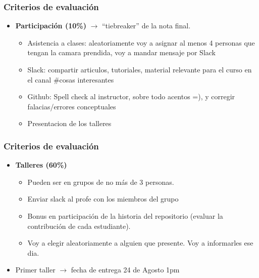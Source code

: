 \documentclass[
  shownotes,
  xcolor={svgnames},
  hyperref={colorlinks,citecolor=DarkBlue,linkcolor=DarkRed,urlcolor=DarkBlue}
  , aspectratio=169]{beamer}
\begin{document}
\begin{frame}
\frametitle{Criterios de evaluación}

\begin{itemize}
\item {\bf Participación (10\%)} $\rightarrow$ ``tiebreaker'' de la nota final. 
\medskip
  \begin{itemize}
    \item Asistencia a clases: aleatoriamente voy a asignar al menos 4 personas que tengan la camara prendida, voy a mandar mensaje por Slack
    \medskip
    \item Slack: compartir articulos, tutoriales, material relevante para el curso en el canal \#cosas interesantes
    \medskip
    \item Github: Spell check al instructor, sobre todo acentos =), y corregir falacias/errores conceptuales
    \medskip
    \item Presentacion de los talleres

  \end{itemize}
\end{itemize}

\end{frame}
\begin{frame}
\frametitle{Criterios de evaluación}
\begin{itemize}
  \item {\bf Talleres (60\%)}
  \bigskip
\begin{itemize}
  \item Pueden ser en grupos de no más de 3 personas. 
  \medskip
  \item Enviar slack al profe con los miembros del grupo
  \medskip
  \item Bonus en participación de la historia del repositorio (evaluar la contribución de cada estudiante).
  \medskip
  \item Voy a elegir aleatoriamente a alguien que presente. Voy a informarles ese dia.
  \end{itemize}
\bigskip

   \item Primer taller $\rightarrow$ fecha de entrega 24 de Agosto 1pm
   
\end{itemize}

\end{frame}
\end{document}
